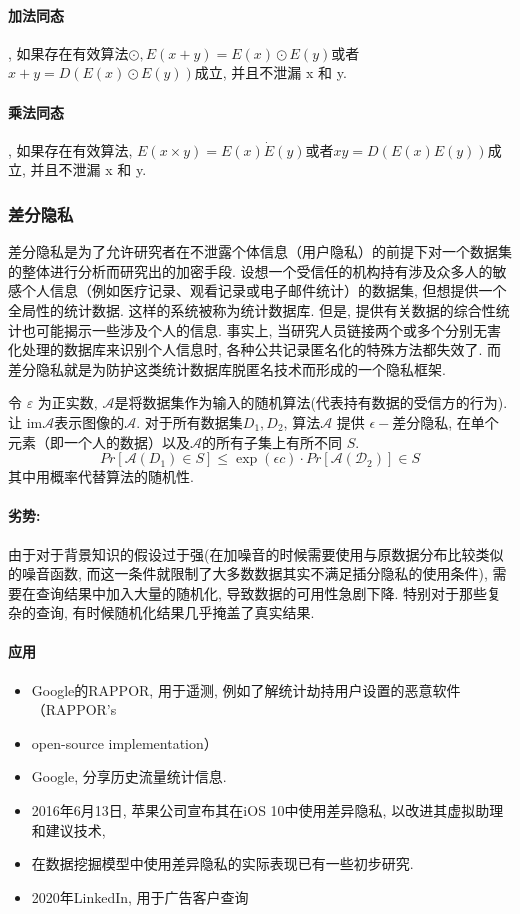 \documentclass[a4paper]{article}
\theoremstyle{definition}
\numberwithin{equation}{section}
\begin{document}
\paragraph{加法同态}, 如果存在有效算法$\odot$$, E(x+y)=E(x)\odot E(y)$或者$ x+y=D(E(x)\odot E(y))$成立, 并且不泄漏 x 和 y. 
\paragraph{乘法同态}, 如果存在有效算法, $E(x \times y)=E(x) \dot E(y)$或者$ xy=D(E(x) E(y))$成立, 并且不泄漏 x 和 y. 



\subsubsection{差分隐私} 
差分隐私是为了允许研究者在不泄露个体信息（用户隐私）的前提下对一个数据集的整体进行分析而研究出的加密手段. \cite{DPDwork2008}
设想一个受信任的机构持有涉及众多人的敏感个人信息（例如医疗记录、观看记录或电子邮件统计）的数据集, 但想提供一个全局性的统计数据. 这样的系统被称为统计数据库. 但是, 提供有关数据的综合性统计也可能揭示一些涉及个人的信息. 事实上, 当研究人员链接两个或多个分别无害化处理的数据库来识别个人信息时, 各种公共记录匿名化的特殊方法都失效了. 而差分隐私就是为防护这类统计数据库脱匿名技术而形成的一个隐私框架. 

令 $\varepsilon$ 为正实数, $\mathcal{A}$是将数据集作为输入的随机算法(代表持有数据的受信方的行为). 让 $\textrm{im}\mathcal{A}$表示图像的$\mathcal {A}$. 对于所有数据集$D_{1}, D_{2}$, 
算法$\mathcal{A}$ 提供 $\epsilon-$差分隐私, 在单个元素（即一个人的数据）以及$\mathcal{A}$的所有子集上有所不同 $S$. 
$$ Pr [ \mathcal{A}(D_1) \in S ] \leqslant \exp(\epsilon c) \cdot Pr [ \mathcal{A(D_2)} ] \in S  $$
其中用概率代替算法的随机性.  
  
\paragraph{劣势:}由于对于背景知识的假设过于强(在加噪音的时候需要使用与原数据分布比较类似的噪音函数, 而这一条件就限制了大多数数据其实不满足插分隐私的使用条件), 需要在查询结果中加入大量的随机化, 导致数据的可用性急剧下降. 特别对于那些复杂的查询, 有时候随机化结果几乎掩盖了真实结果. 
\paragraph{应用}
\begin{itemize}
    \item Google的RAPPOR, 用于遥测, 例如了解统计劫持用户设置的恶意软件（RAPPOR's \item open-source implementation）
    \item Google, 分享历史流量统计信息. 
    \item 2016年6月13日, 苹果公司宣布其在iOS 10中使用差异隐私, 以改进其虚拟助理和建议技术,  
    \item 在数据挖掘模型中使用差异隐私的实际表现已有一些初步研究. \citep{FLETCHER201716}
    \item 2020年LinkedIn, 用于广告客户查询
\end{itemize}
\end{document}
